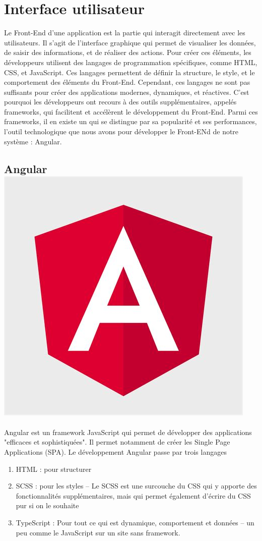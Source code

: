 	\section{Interface utilisateur}
		Le Front-End d'une application est la partie qui interagit directement avec les utilisateurs. Il s'agit de l'interface graphique qui permet de visualiser les donn\'ees, de saisir des informations, et de r\'ealiser des actions. Pour cr\'eer ces \'el\'ements, les d\'eveloppeurs utilisent des langages de programmation sp\'ecifiques, comme HTML, CSS, et JavaScript. Ces langages permettent de d\'efinir la structure, le style, et le comportement des \'el\'ements du Front-End. Cependant, ces langages ne sont pas suffisants pour cr\'eer des applications modernes, dynamiques, et r\'eactives. C'est pourquoi les d\'eveloppeurs ont recours \`a des outils suppl\'ementaires, appel\'es frameworks, qui facilitent et acc\'el\`erent le d\'eveloppement du Front-End. Parmi ces frameworks, il en existe un qui se distingue par sa popularit\'e et ses performances, l'outil technologique que nous avons pour d\'evelopper le Front-ENd de notre syst\`eme : Angular.
			
		\subsection{Angular \includegraphics[height=2ex]{Pictures/angularLogo.jpeg}}
			Angular est un framework JavaScript qui permet de d\'evelopper des applications "efficaces et sophistiqu\'ees". Il permet notamment de cr\'eer les Single Page Applications (SPA).
			Le d\'eveloppement Angular passe par trois langages
			\begin{enumerate}
				\item HTML : pour structurer
				\item SCSS : pour les styles – Le SCSS est une surcouche du CSS qui y apporte des fonctionnalit\'es suppl\'ementaires, mais qui permet \'egalement d'\'ecrire du CSS pur si on le souhaite
				\item TypeScript : Pour tout ce qui est dynamique, comportement et donn\'ees – un peu comme le JavaScript sur un site sans framework.
			\end{enumerate}
			
